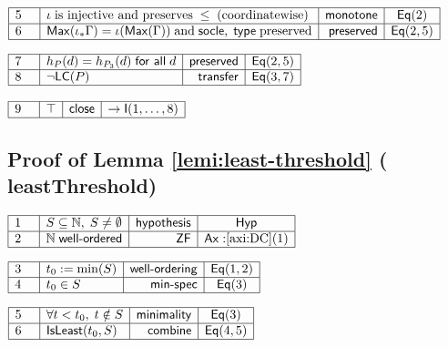 \documentclass[11pt,reqno]{amsart}
\providecommand{\N}{\mathbb{N}}
\begin{document}
\nointerlineskip\noindent$%
\begin{array}{|m{0.5cm}|l|r|c|}
\hline
5 & \iota\;\text{is injective and preserves}\;\le\;(\text{coordinatewise}) & 
\mathsf{monotone} & \mathsf{Eq}(2) \\ \hline
6 & \mathsf{Max}(\iota_{*}\Gamma)=\iota(\mathsf{Max}(\Gamma))\;\text{and}\;%
\mathsf{socle},\;\mathsf{type}\;\text{preserved} & \mathsf{preserved} & 
\mathsf{Eq}(2,5) \\ \hline
\end{array}%
$

\nointerlineskip\noindent$%
\begin{array}{|m{0.5cm}|l|r|c|}
\hline
7 & h_{P}(d)=h_{P_{3}}(d)\;\mathsf{for\ all}\;d & \mathsf{preserved} & 
\mathsf{Eq}(2,5) \\ \hline
8 & \neg\mathsf{LC}(P) & \mathsf{transfer} & \mathsf{Eq}(3,7) \\ \hline
\end{array}%
$

\nointerlineskip\noindent$%
\begin{array}{|m{0.5cm}|l|r|c|}
\hline
9 & \top & \mathsf{close} & \to\mathsf{I}(1,\dots,8) \\ \hline
\end{array}%
$

\medskip

\subsection*{Proof of Lemma \protect\ref{lemi:least-threshold} (\textsf{%
leastThreshold})}

\noindent $%
\begin{array}{|m{0.5cm}|l|r|c|}
\hline
1 & S\subseteq \N,\;S\neq \emptyset  & \mathsf{hypothesis} & \mathsf{Hyp} \\ 
\hline
2 & \N\;\mathsf{well\text{-}ordered} & \mathsf{ZF} & \mathsf{Ax:}\ref{axi:DC}%
(1) \\ \hline
\end{array}%
$

\nointerlineskip\noindent$%
\begin{array}{|m{0.5cm}|l|r|c|}
\hline
3 & t_{0}:=\min(S) & \mathsf{well\text{-}ordering} & \mathsf{Eq}(1,2) \\ 
\hline
4 & t_{0}\in S & \mathsf{min\text{-}spec} & \mathsf{Eq}(3) \\ \hline
\end{array}%
$

\nointerlineskip\noindent$%
\begin{array}{|m{0.5cm}|l|r|c|}
\hline
5 & \forall t<t_{0},\;t\notin S & \mathsf{minimality} & \mathsf{Eq}(3) \\ 
\hline
6 & \mathsf{IsLeast}(t_{0},S) & \mathsf{combine} & \mathsf{Eq}(4,5) \\ \hline
\end{array}%
$
\end{document}
